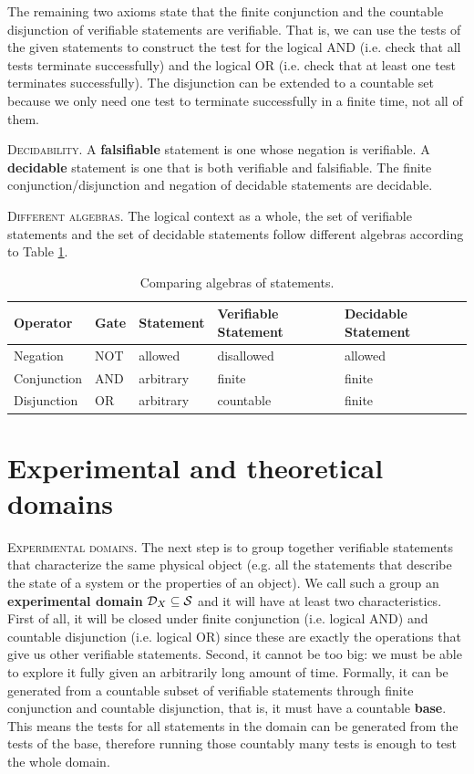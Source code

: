 \documentclass[10pt,twocolumn, nofootinbib]{revtex4-2}
\newcommand\partitle[1]{\textsc{#1}.}
\begin{document}
The remaining two axioms state that the finite conjunction and the countable disjunction of verifiable statements are verifiable. That is, we can use the tests of the given statements to construct the test for the logical AND (i.e. check that all tests terminate successfully) and the logical OR (i.e. check that at least one test terminates successfully). The disjunction can be extended to a countable set because we only need one test to terminate successfully in a finite time, not all of them.

\partitle{Decidability} A \textbf{falsifiable} statement is one whose negation is verifiable. A \textbf{decidable} statement is one that is both verifiable and falsifiable. The finite conjunction/disjunction and negation of decidable statements are decidable.

\partitle{Different algebras} The logical context as a whole, the set of verifiable statements and the set of decidable statements follow different algebras according to Table \ref{algebras}.

\begin{table}[h]
	\centering
	\begin{tabular}{p{} p{} p{} p{} p{}}
		Operator & Gate & Statement & Verifiable Statement & Decidable Statement  \\ 
		\hline 
		Negation & NOT & allowed & disallowed & allowed \\ 
		Conjunction & AND & arbitrary  & finite & finite \\ 
		Disjunction & OR & arbitrary  & countable & finite \\ 
	\end{tabular}
	\caption{Comparing algebras of statements.}
	\label{algebras}
\end{table}


\section{Experimental and theoretical domains}

\partitle{Experimental domains} The next step is to group together verifiable statements that characterize the same physical object (e.g. all the statements that describe the state of a system or the properties of an object). We call such a group an \textbf{experimental domain} $\mathcal{D}_X \subseteq \mathcal{S}$ and it will have at least two characteristics. First of all, it will be closed under finite conjunction (i.e. logical AND) and countable disjunction (i.e. logical OR) since these are exactly the operations that give us other verifiable statements. Second, it cannot be too big: we must be able to explore it fully given an arbitrarily long amount of time. Formally, it can be generated from a countable subset of verifiable statements through finite conjunction and countable disjunction, that is, it must have a countable \textbf{base}. This means the tests for all statements in the domain can be generated from the tests of the base, therefore running those countably many tests is enough to test the whole domain.
\end{document}

